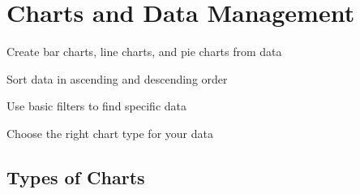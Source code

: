\chapter{Charts and Data Management}
\label{ch:excel-charts}

\begin{objectives}
  \item Create bar charts, line charts, and pie charts from data
  \item Sort data in ascending and descending order
  \item Use basic filters to find specific data
  \item Choose the right chart type for your data
\end{objectives}


\section{Types of Charts}
\label{sec:chart-types}

